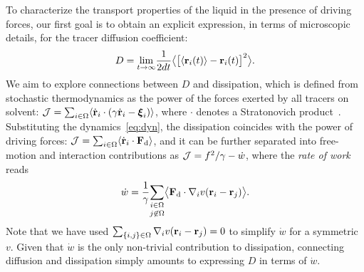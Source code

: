 \documentclass[superscriptaddress, twocolumn, prx, longbibliography, nofootinbib]{revtex4-1}
\begin{document}
To characterize the transport properties of the liquid in the presence of driving forces, our first goal is to obtain an explicit expression, in terms of microscopic details, for the tracer diffusion coefficient:
\begin{equation}
	D = \underset{t\to\infty}{\lim} \frac{1}{2dt} \big\langle \big[\langle{\bf r}_i(t)\rangle-{\bf r}_i(t)\big]^2 \big\rangle .
\end{equation}
We aim to explore connections between $D$ and dissipation, which is defined from stochastic thermodynamics as the power of the forces exerted by all tracers on solvent: ${\cal J} = \sum_{i\in\Omega}\langle\dot{\bf r}_i\cdot(\gamma\dot{\bf r}_i-{\boldsymbol\xi}_i)\rangle$, where $\cdot$ denotes a Stratonovich product~\cite{Sekimoto1998, Seifert2012}. Substituting the dynamics~\eqref{eq:dyn}, the dissipation coincides with the power of driving forces: ${\cal J} = \sum_{i\in\Omega}\langle\dot{\bf r}_i\cdot{\bf F}_{\rm d}\rangle$, and it can be further separated into free-motion and interaction contributions as ${\cal J} = f^2/\gamma - \dot w$, where the {\it rate of work} reads
\begin{equation}\label{eq:work}
	\dot w = \frac{1}{\gamma} \underset{j\not\in\Omega}{\sum_{i\in\Omega}}\big\langle {\bf F}_{\rm d}\cdot\nabla_iv({\bf r}_i-{\bf r}_j)\big\rangle.
\end{equation}
Note that we have used $\sum_{\{i,j\}\in\Omega}\nabla_iv({\bf r}_i-{\bf r}_j)=0$ to simplify $\dot w$ for a symmetric $v$. Given that $\dot w$ is the only non-trivial contribution to dissipation, connecting diffusion and dissipation simply amounts to expressing $D$ in terms of $\dot w$.
\end{document}
